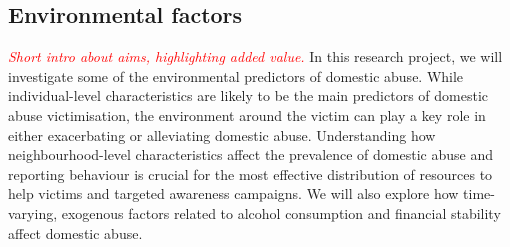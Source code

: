 \documentclass[11pt, a4paper]{article}
\begin{document}
\subsection*{Environmental factors}

\textcolor{red}{\textit{Short intro about aims, highlighting added value.}}
In this research project, we will investigate some of the environmental predictors of domestic abuse. While individual-level characteristics are likely to be the main predictors of domestic abuse victimisation, the environment around the victim can play a key role in either exacerbating or alleviating domestic abuse. Understanding how neighbourhood-level characteristics affect the prevalence of domestic abuse and reporting behaviour is crucial for the most effective distribution of resources to help victims and targeted awareness campaigns. We will also explore how time-varying, exogenous factors related to alcohol consumption and financial stability affect domestic abuse. 


%
%
%
%
%
\end{document}

